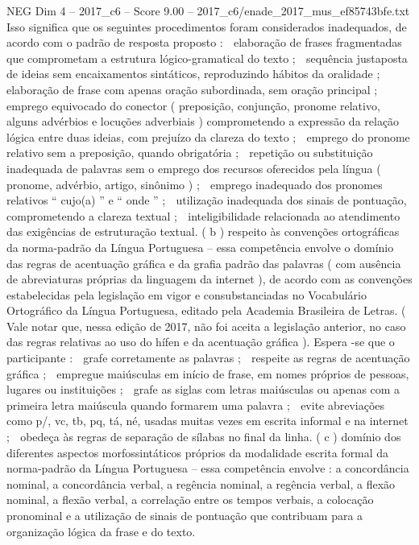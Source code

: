 \begin{textsample}{NEG Dim 4 – 2017\_c6 – Score 9.00 – 2017\_c6/enade\_2017\_mus\_ef85743bfe.txt}
Isso significa que os seguintes procedimentos foram considerados inadequados, de acordo com o padrão de resposta proposto :  elaboração de frases fragmentadas que comprometam a estrutura lógico-gramatical do texto ;  sequência justaposta de ideias sem encaixamentos sintáticos, reproduzindo hábitos da oralidade ;  elaboração de frase com apenas oração subordinada, sem oração principal ;  emprego equivocado do conector ( preposição, conjunção, pronome relativo, alguns advérbios e locuções adverbiais ) comprometendo a expressão da relação lógica entre duas ideias, com prejuízo da clareza do texto ;  emprego do pronome relativo sem a preposição, quando obrigatória ;  repetição ou substituição inadequada de palavras sem o emprego dos recursos oferecidos pela língua ( pronome, advérbio, artigo, sinônimo ) ;  emprego inadequado dos pronomes relativos “ cujo(a) ” e “ onde ” ;  utilização inadequada dos sinais de pontuação, comprometendo a clareza textual ;  inteligibilidade relacionada ao atendimento das exigências de estruturação textual. ( b ) respeito às convenções ortográficas da norma-padrão da Língua Portuguesa – essa competência envolve o domínio das regras de acentuação gráfica e da grafia padrão das palavras ( com ausência de abreviaturas próprias da linguagem da internet ), de acordo com as convenções estabelecidas pela legislação em vigor e consubstanciadas no Vocabulário Ortográfico da Língua Portuguesa, editado pela Academia Brasileira de Letras. ( Vale notar que, nessa edição de 2017, não foi aceita a legislação anterior, no caso das regras relativas ao uso do hífen e da acentuação gráfica ).
Espera -se que o participante :  grafe corretamente as palavras ;  respeite as regras de acentuação gráfica ;  empregue maiúsculas em início de frase, em nomes próprios de pessoas, lugares ou instituições ;  grafe as siglas com letras maiúsculas ou apenas com a primeira letra maiúscula quando formarem uma palavra ;  evite abreviações como p/, vc, tb, pq, tá, né, usadas muitas vezes em escrita informal e na internet ;  obedeça às regras de separação de sílabas no final da linha. ( c ) domínio dos diferentes aspectos morfossintáticos próprios da modalidade escrita formal da norma-padrão da Língua Portuguesa – essa competência envolve : a concordância nominal, a concordância verbal, a regência nominal, a regência verbal, a flexão nominal, a flexão verbal, a correlação entre os tempos verbais, a colocação pronominal e a utilização de sinais de pontuação que contribuam para a organização lógica da frase e do texto.

\end{textsample}
